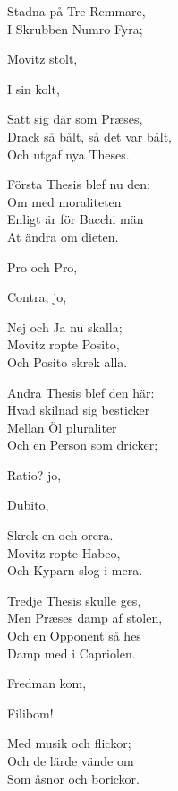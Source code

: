 Stadna på Tre Remmare,\\
I Skrubben Numro Fyra;\par
\hspace{20pt}Movitz stolt,\par
\hspace{20pt}I sin kolt,\par
\hspace{20pt}Satt sig där som Præses,\\
Drack så bålt, så det var bålt,\\
Och utgaf nya Theses.\par
\vspace{10pt}
Första Thesis blef nu den:\\
Om med moraliteten\\
Enligt är för Bacchi män\\
At ändra om dieten.\par
\hspace{20pt}Pro och Pro,\par
\hspace{20pt}Contra, jo,\par
\hspace{20pt}Nej och Ja nu skalla;\\
Movitz ropte Posito,\\
Och Posito skrek alla.\par
\vspace{10pt}
Andra Thesis blef den här:\\
Hvad skilnad sig besticker\\
Mellan Öl pluraliter\\
Och en Person som dricker;\par
\hspace{20pt}Ratio? jo,\par
\hspace{20pt}Dubito,\par
\hspace{20pt}Skrek en och orera.\\
Movitz ropte Habeo,\\
Och Kyparn slog i mera.\par
\vspace{10pt}
Tredje Thesis skulle ges,\\
Men Præses damp af stolen,\\
Och en Opponent så hes\\
Damp med i Capriolen.\par
\hspace{20pt}Fredman kom,\par
\hspace{20pt}Filibom!\par
\hspace{20pt}Med musik och flickor;\\
Och de lärde vände om\\
Som åsnor och borickor.
